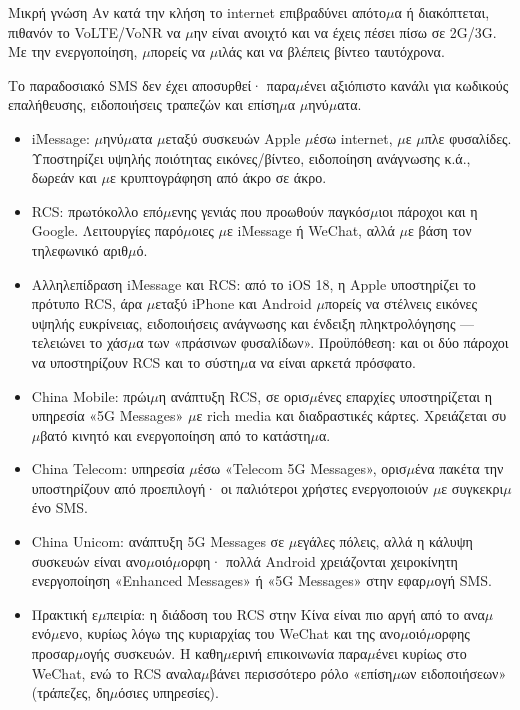 \begin{tcbinfo}{Μικρή γνώση}
Αν κατά την κλήση το internet επιβραδύνει απότο$\mu$α ή διακόπτεται, πιθανόν το VoLTE/VoNR να $\mu$ην είναι ανοιχτό και να έχεις πέσει πίσω σε 2G/3G. Με την ενεργοποίηση, $\mu$πορείς να $\mu$ιλάς και να βλέπεις βίντεο ταυτόχρονα.

\end{tcbinfo}


Το παραδοσιακό SMS δεν έχει αποσυρθεί· παρα$\mu$ένει αξιόπιστο κανάλι για κωδικούς επαλήθευσης, ειδοποιήσεις τραπεζών και επίση$\mu$α $\mu$ηνύ$\mu$ατα.

\begin{itemize}
  \item iMessage: $\mu$ηνύ$\mu$ατα $\mu$εταξύ συσκευών Apple $\mu$έσω internet, $\mu$ε $\mu$πλε φυσαλίδες. Υποστηρίζει υψηλής ποιότητας εικόνες/βίντεο, ειδοποίηση ανάγνωσης κ.ά., δωρεάν και $\mu$ε κρυπτογράφηση από άκρο σε άκρο.
  \item RCS: πρωτόκολλο επό$\mu$ενης γενιάς που προωθούν παγκόσ$\mu$ιοι πάροχοι και η Google. Λειτουργίες παρό$\mu$οιες $\mu$ε iMessage ή WeChat, αλλά $\mu$ε βάση τον τηλεφωνικό αριθ$\mu$ό.
  \item Αλληλεπίδραση iMessage και RCS: από το iOS 18, η Apple υποστηρίζει το πρότυπο RCS, άρα $\mu$εταξύ iPhone και Android $\mu$πορείς να στέλνεις εικόνες υψηλής ευκρίνειας, ειδοποιήσεις ανάγνωσης και ένδειξη πληκτρολόγησης — τελειώνει το χάσ$\mu$α των «πράσινων φυσαλίδων». Προϋπόθεση: και οι δύο πάροχοι να υποστηρίζουν RCS και το σύστη$\mu$α να είναι αρκετά πρόσφατο.
\end{itemize}


\begin{itemize}
  \item China Mobile: πρώι$\mu$η ανάπτυξη RCS, σε ορισ$\mu$ένες επαρχίες υποστηρίζεται η υπηρεσία «5G Messages» $\mu$ε rich media και διαδραστικές κάρτες. Χρειάζεται συ$\mu$βατό κινητό και ενεργοποίηση από το κατάστη$\mu$α.
  \item China Telecom: υπηρεσία $\mu$έσω «Telecom 5G Messages», ορισ$\mu$ένα πακέτα την υποστηρίζουν από προεπιλογή· οι παλιότεροι χρήστες ενεργοποιούν $\mu$ε συγκεκρι$\mu$ένο SMS.
  \item China Unicom: ανάπτυξη 5G Messages σε $\mu$εγάλες πόλεις, αλλά η κάλυψη συσκευών είναι ανο$\mu$οιό$\mu$ορφη· πολλά Android χρειάζονται χειροκίνητη ενεργοποίηση «Enhanced Messages» ή «5G Messages» στην εφαρ$\mu$ογή SMS.
  \item Πρακτική ε$\mu$πειρία: η διάδοση του RCS στην Κίνα είναι πιο αργή από το ανα$\mu$ενό$\mu$ενο, κυρίως λόγω της κυριαρχίας του WeChat και της ανο$\mu$οιό$\mu$ορφης προσαρ$\mu$ογής συσκευών. Η καθη$\mu$ερινή επικοινωνία παρα$\mu$ένει κυρίως στο WeChat, ενώ το RCS αναλα$\mu$βάνει περισσότερο ρόλο «επίση$\mu$ων ειδοποιήσεων» (τράπεζες, δη$\mu$όσιες υπηρεσίες).
\end{itemize}

